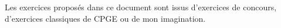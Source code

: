 \begin{center}
Les exercices proposés dans ce document sont issus d'exercices de concours, d'exercices classiques de CPGE ou de mon imagination. 
\end{center}